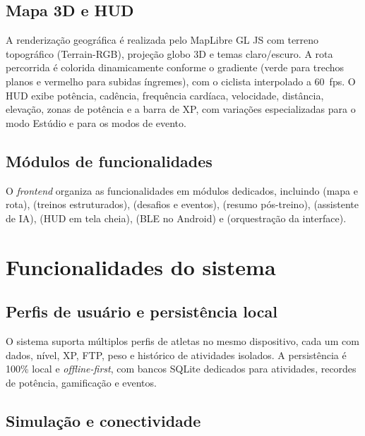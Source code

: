 \subsection{Mapa 3D e HUD}
\label{sec:frontend-mapa}

A renderização geográfica é realizada pelo MapLibre GL JS \cite{maplibre2024}
com terreno topográfico (Terrain-RGB), projeção globo 3D e temas claro/escuro.
A rota percorrida é colorida dinamicamente conforme o gradiente (verde para
trechos planos e vermelho para subidas íngremes), com o ciclista interpolado a
60~fps. O HUD exibe potência, cadência, frequência cardíaca, velocidade,
distância, elevação, zonas de potência e a barra de XP, com variações
especializadas para o modo Estúdio e para os modos de evento.

\subsection{Módulos de funcionalidades}
\label{sec:frontend-modulos}

O \textit{frontend} organiza as funcionalidades em módulos dedicados,
incluindo  (mapa e rota), 
(treinos estruturados),  (desafios e eventos),
 (resumo pós-treino), 
(assistente de IA),  (HUD em tela cheia),
 (BLE no Android) e 
(orquestração da interface).

\section{Funcionalidades do sistema}
\label{sec:funcionalidades}

\subsection{Perfis de usuário e persistência local}
\label{sec:func-perfis}

O sistema suporta múltiplos perfis de atletas no mesmo dispositivo, cada um com
dados, nível, XP, FTP, peso e histórico de atividades isolados. A persistência
é 100\% local e \textit{offline-first}, com bancos SQLite dedicados para
atividades, recordes de potência, gamificação e eventos.

\subsection{Simulação e conectividade}
\label{sec:func-simulacao}

